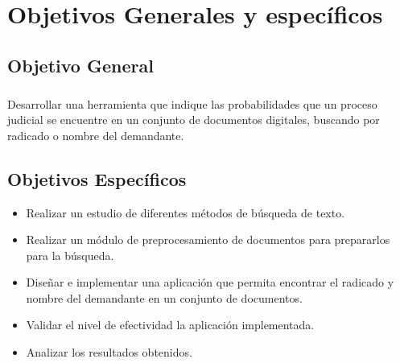 \chapter{Objetivos Generales y espec\'ificos}
\label{sec:objetivos}

\section{Objetivo General}
\paragraph{}
Desarrollar una herramienta que indique las probabilidades que un 
proceso judicial se encuentre en un conjunto de documentos digitales, 
buscando por radicado o nombre del demandante.
\section{Objetivos Espec\'ificos}
\begin{itemize}
\item Realizar un estudio de diferentes m\'etodos de b\'usqueda de texto.
\item Realizar un m\'odulo de preprocesamiento de documentos para prepararlos para la b\'usqueda.
\item Dise\~nar e implementar una aplicaci\'on que permita encontrar el radicado y nombre del demandante en un conjunto de documentos.
\item Validar el nivel de efectividad la aplicaci\'on implementada.
\item Analizar los resultados obtenidos.
\end{itemize}


\pagebreak